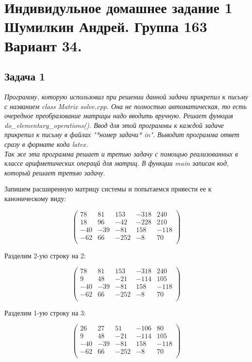 

	\section{Индивидульное домашнее задание 1 \\ Шумилкин Андрей. Группа 163 \\ Вариант 34. } 
	\subsection{Задача 1} 
	{\sl Программу, которую использовал при решении данной задачи прикрепил к письму с названием class Matrix solve.cpp. Она не полностью автоматическая, то есть очередное преобразование матрицы надо вводить вручную. Решает функция do\_elementary\_operations(). Ввод для этой программы к каждой задаче прикрепил к письму в файлах "*номер задачи* in". Выводит программа ответ сразу в формате кода latex. \\ Так же эта программа решает и третью задачу с помощью реализованных в классе арифметических операцй для матриц. В функции main записан код, который решает третью задачу}.
	
	Запишем расширенную матрицу системы и попытаемся привести ее к каноническому виду:
	
	\[
	\begin{pmatrix}
	78 & 81 & 153 & -318 & 240 \\
	18 & 96 & -42 & -228 & 210 \\
	-40 & -39 & -81 & 158 & -118 \\
	-62 & 66 & -252 & -8 & 70 \\
	\end{pmatrix}
	\]
	
	Разделим 2-ую строку на 2:
	
	\[
	\begin{pmatrix}
	78 & 81 & 153 & -318 & 240 \\
	9 & 48 & -21 & -114 & 105 \\
	-40 & -39 & -81 & 158 & -118 \\
	-62 & 66 & -252 & -8 & 70 \\
	\end{pmatrix}
	\]
	
	Разделим 1-ую строку на 3:
	
	\[
	\begin{pmatrix}
	26 & 27 & 51 & -106 & 80 \\
	9 & 48 & -21 & -114 & 105 \\
	-40 & -39 & -81 & 158 & -118 \\
	-62 & 66 & -252 & -8 & 70 \\
	\end{pmatrix}
	\]
	
